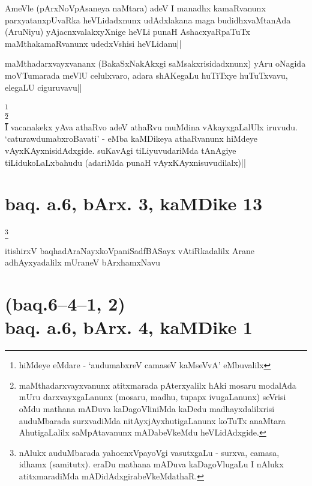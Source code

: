 \begin{artha}
AmeVle (pArxNoVpAsaneya naMtara) adeV I manadhx kamaRvanunx 
parxyatanxpUvaRka heVLidadxnunx udAdxlakana maga budidhxvaMtanAda 
(AruNiyu) yAjacnxvalakxyXnige heVLi punaH AshacxyaRpaTuTx 
maMthakamaRvanunx udedxVshisi heVLidanu||
\end{artha}


\begin{artha}
maMthadarxvayxvananx (BakaSxNakAkxgi saMsakxrisidadxnunx) yAru oNagida 
moVTumarada meVlU celulxvaro, adara shAKegaLu huTiTxye huTuTxvavu, 
elegaLU ciguruvavu||
\end{artha}

\begin{artha}
\footnote[1]{hiMdeye eMdare - `audumabxreV camaseV kaMseVvA' eMbuvalilx}\\
\footnote[2]{maMthadarxvayxvanunx atitxmarada pAterxyalilx hAki mosaru 
modalAda mUru darxvayxgaLanunx (mosaru, madhu, tupapx ivugaLanunx) 
seVrisi oMdu mathana mADuva kaDagoVliniMda kaDedu madhayxdalilxrisi 
auduMbarada surxvadiMda nitAyxjAyxhutigaLanunx koTuTx anaMtara 
AhutigaLalilx saMpAtavanunx mADabeVkeMdu heVLidAdxgide.}\\
I vacanakekx yAva athaRvo adeV athaRvu muMdina vAkayxgaLalUlx iruvudu. 
`caturawdumabxroBavati' - eMba kaMDikeya athaRvanunx hiMdeye 
vAyxKAyxnisidAdxgide. suKavAgi tiLiyuvudariMda tAnAgiye 
tiLidukoLaLxbahudu (adariMda punaH vAyxKAyxnisuvudilalx)||
\end{artha}

\section*{baq. a.6, bArx. 3, kaMDike 13}

\footnote[3]{nAlukx auduMbarada yahocnxVpayoVgi vasutxgaLu - surxva, 
camasa, idhamx (samitutx). eraDu mathana mADuva kaDagoVlugaLu I nAlukx 
atitxmaradiMda mADidAdxgirabeVkeMdathaR.}\stext

\begin{center}
itishirxV baqhadAraNayxkoVpaniSadfBASayx vAtiRkadalilx Arane 
adhAyxyadalilx mUraneV bArxhamxNavu
\end{center}

\section*{(baq.6--4--1, 2)\\ baq. a.6, bArx. 4, kaMDike 1}

